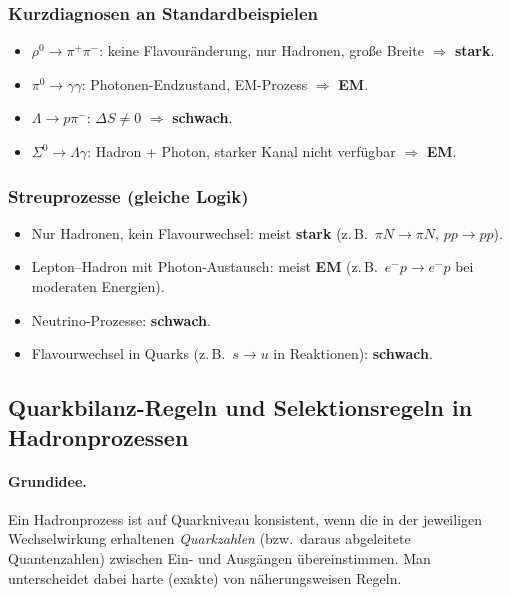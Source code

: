 \documentclass[10pt, letterpaper]{article}
\begin{document}
\subsubsection*{Kurzdiagnosen an Standardbeispielen}

\begin{itemize}
\item $\rho^0\to\pi^+\pi^-$: keine Flavouränderung, nur Hadronen, große Breite $\Rightarrow$ \textbf{stark}.
\item $\pi^0\to\gamma\gamma$: Photonen-Endzustand, EM-Prozess $\Rightarrow$ \textbf{EM}.
\item $\Lambda\to p\pi^-$: $\Delta S\neq 0$ $\Rightarrow$ \textbf{schwach}.
\item $\Sigma^0\to\Lambda\gamma$: Hadron + Photon, starker Kanal nicht verfügbar $\Rightarrow$ \textbf{EM}.
\end{itemize}

\subsubsection*{Streuprozesse (gleiche Logik)}

\begin{itemize}
\item Nur Hadronen, kein Flavourwechsel: meist \textbf{stark} (z.\,B.\ $\pi N\to\pi N$, $pp\to pp$).
\item Lepton--Hadron mit Photon-Austausch: meist \textbf{EM} (z.\,B.\ $e^-p\to e^-p$ bei moderaten Energien).
\item Neutrino-Prozesse: \textbf{schwach}.
\item Flavourwechsel in Quarks (z.\,B.\ $s\to u$ in Reaktionen): \textbf{schwach}.
\end{itemize}



\subsection*{Quarkbilanz-Regeln und Selektionsregeln in Hadronprozessen}

\paragraph{Grundidee.}
Ein Hadronprozess ist auf Quarkniveau konsistent, wenn die in der jeweiligen Wechselwirkung
erhaltenen \emph{Quarkzahlen} (bzw.\ daraus abgeleitete Quantenzahlen) zwischen Ein- und Ausgängen
übereinstimmen. Man unterscheidet dabei harte (exakte) von näherungsweisen Regeln.
\end{document}
